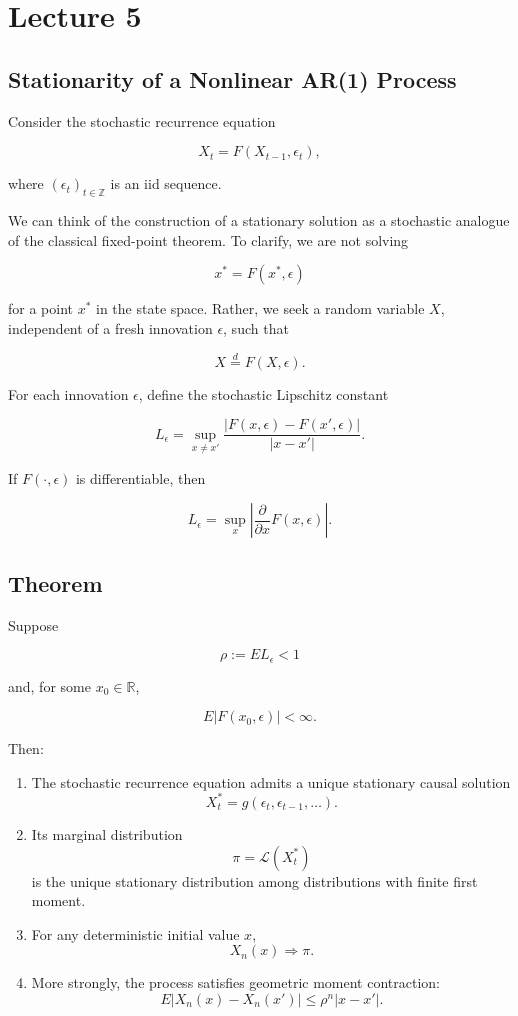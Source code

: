 \section{Lecture 5}

\subsection*{Stationarity of a Nonlinear AR(1) Process}
Consider the stochastic recurrence equation

\[X_t = F(X_{t-1},\epsilon_t),\]

where \((\epsilon_t)_{t\in\mathbb Z}\) is an iid sequence.

We can think of the construction of a stationary solution as a stochastic analogue of the classical fixed-point theorem. To clarify, we are not solving

\[x^*=F(x^*,\epsilon)\]

for a point \(x^*\) in the state space. Rather, we seek a random variable \(X\), independent of a fresh innovation \(\epsilon\), such that

\[X\overset d=F(X,\epsilon).\]

For each innovation \(\epsilon\), define the stochastic Lipschitz constant

\[L_\epsilon
=
\sup_{x\neq x'}
\frac{|F(x,\epsilon)-F(x',\epsilon)|}{|x-x'|}.\]

If \(F(\cdot,\epsilon)\) is differentiable, then

\[L_\epsilon=\sup_x\left|\frac{\partial}{\partial x}F(x,\epsilon)\right|.\]

\subsection*{Theorem}
Suppose

\[\rho:=EL_\epsilon<1\]

and, for some \(x_0\in\mathbb R\),

\[E|F(x_0,\epsilon)|<\infty.\]

Then:

\begin{enumerate}
\item
  The stochastic recurrence equation admits a unique stationary causal solution
  \[X_t^*=g(\epsilon_t,\epsilon_{t-1},\ldots).\]
\item
  Its marginal distribution
  \[\pi=\mathcal L(X_t^*)\]
  is the unique stationary distribution among distributions with finite first moment.
\item
  For any deterministic initial value \(x\),
  \[X_n(x)\Rightarrow\pi.\]
\item
  More strongly, the process satisfies geometric moment contraction:
  \[E|X_n(x)-X_n(x')|
  \le
  \rho^n|x-x'|.\]
\end{enumerate}

